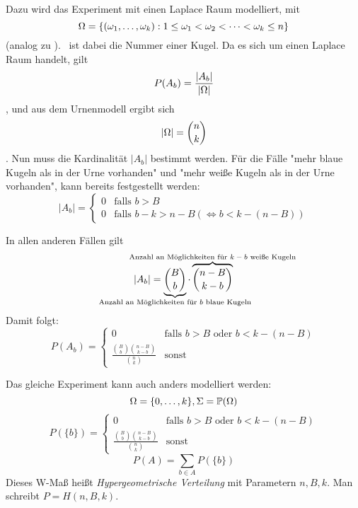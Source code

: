 Dazu wird das Experiment mit einen Laplace Raum modelliert, mit
\begin{equation*}
    \Omega = \{ (\omega_1, \dots ,\omega_k): 1 \leq \omega_1 < \omega_2 < \dots < \omega_k \leq n \}
\end{equation*}
(analog zu ). \w\ ist dabei die Nummer einer Kugel.
Da es sich um einen Laplace Raum handelt, gilt
\begin{equation*}
    P(A_b) = \frac{|A_b|}{|\Omega|}
\end{equation*},
und aus dem Urnenmodell ergibt sich
\begin{equation*}
    |\Omega| = \binom{n}{k}
\end{equation*}.
Nun muss die Kardinalität $|A_b|$ bestimmt werden.
Für die Fälle "mehr blaue Kugeln als in der Urne vorhanden" und
"mehr weiße Kugeln als in der Urne vorhanden", kann bereits festgestellt werden:
\begin{equation*}
    |A_b| = \begin{cases}
        0 &\text{falls } b>B\\
        0 &\text{falls } b-k>n-B (\iff b<k-(n-B))
    \end{cases}
\end{equation*}

In allen anderen Fällen gilt
\begin{equation*}
    |A_b| = \underbrace{\binom{B}{b}}_\text{
        \hidewidth 
        Anzahl an Möglichkeiten für $b$ blaue Kugeln 
        \hidewidth} \cdot
     \overbrace{\binom{n-B}{k-b}}^\text{
        \hidewidth 
        Anzahl an Möglichkeiten für $k-b$ weiße Kugeln
        \hidewidth }
\end{equation*}
Damit folgt:
\begin{equation*}
    P(A_b)= \begin{cases}
        0 &\text{falls } b>B \text{ oder } b<k-(n-B)\\
        \frac{\binom{B}{b} \binom{n-B}{k-b}}{\binom{n}{k}} &\text{sonst}
    \end{cases}
\end{equation*}

Das gleiche Experiment kann auch anders modelliert werden:
\begin{equation*}
    \Omega = \{ 0, \dots ,k \}, \Sigma = \mathbb{P}(\Omega)
\end{equation*}
\begin{equation*}
    P(\{b\}) = \begin{cases}
        0 &\text{falls } b>B \text{ oder } b<k-(n-B)\\
        \frac{\binom{B}{b} \binom{n-B}{k-b}}{\binom{n}{k}} &\text{sonst}
    \end{cases}
\end{equation*}
\begin{equation*}
    P(A) = \sum_{b \in A} P(\{b\})
\end{equation*}
Dieses W-Maß heißt \emph{Hypergeometrische Verteilung} mit Parametern $n, B, k$.
Man schreibt $P=H(n,B,k)$.